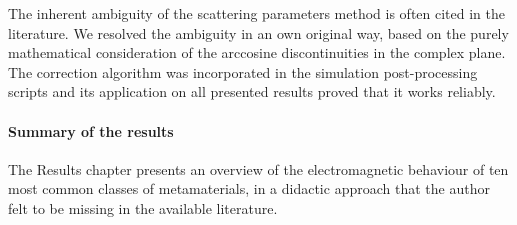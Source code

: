 The inherent ambiguity of the scattering parameters method is often cited in the literature. We resolved the ambiguity in an own original way, based on the purely mathematical consideration of the arccosine discontinuities in the complex plane. The correction algorithm was incorporated in the simulation post-processing scripts and its application on all presented results proved that it works reliably. 

\paragraph{Summary of the results}
The Results chapter presents an overview of the electromagnetic behaviour of ten most common classes of metamaterials, in a didactic approach that the author felt to be missing in the available literature. %


